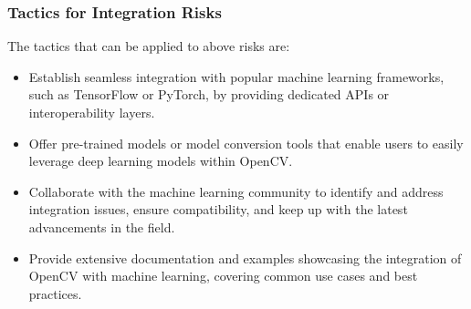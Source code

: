  \subsubsection{Tactics for Integration Risks \label{subsubSection::IntegrationTactic}}
The tactics that can be applied to above risks are:
\begin{itemize}
     \item Establish seamless integration with popular machine learning frameworks, such as TensorFlow or PyTorch, by providing dedicated APIs or interoperability layers.
     \item Offer pre-trained models or model conversion tools that enable users to easily leverage deep learning models within OpenCV.
     \item Collaborate with the machine learning community to identify and address integration issues, ensure compatibility, and keep up with the latest advancements in the field.
     \item Provide extensive documentation and examples showcasing the integration of OpenCV with machine learning, covering common use cases and best practices.
\end{itemize}

